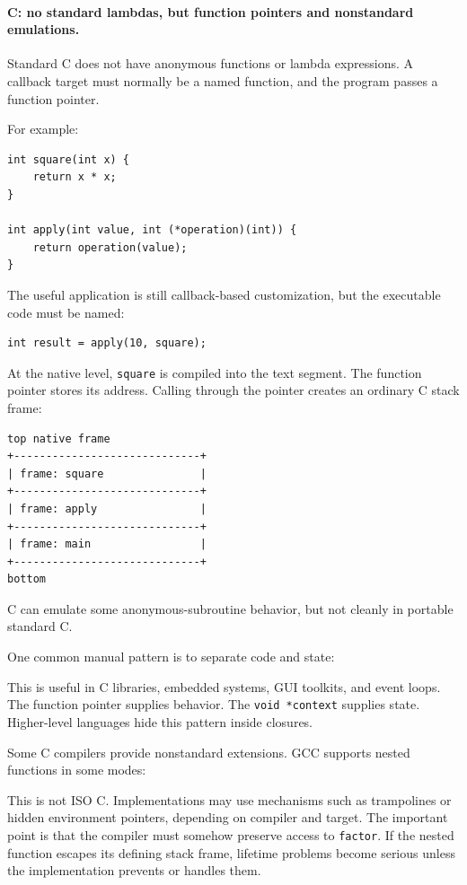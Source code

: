 \paragraph{C: no standard lambdas, but function pointers and nonstandard emulations.}

Standard C does not have anonymous functions or lambda expressions. A callback target must normally be a named function, and the program passes a function pointer.

For example:

\begin{verbatim}
int square(int x) {
    return x * x;
}

int apply(int value, int (*operation)(int)) {
    return operation(value);
}
\end{verbatim}

The useful application is still callback-based customization, but the executable code must be named:

\begin{verbatim}
int result = apply(10, square);
\end{verbatim}

At the native level, \texttt{square} is compiled into the text segment. The function pointer stores its address. Calling through the pointer creates an ordinary C stack frame:

\begin{verbatim}
top native frame
+-----------------------------+
| frame: square               |
+-----------------------------+
| frame: apply                |
+-----------------------------+
| frame: main                 |
+-----------------------------+
bottom
\end{verbatim}

C can emulate some anonymous-subroutine behavior, but not cleanly in portable standard C.

One common manual pattern is to separate code and state:

This is useful in C libraries, embedded systems, GUI toolkits, and event loops. The function pointer supplies behavior. The \texttt{void *context} supplies state. Higher-level languages hide this pattern inside closures.

Some C compilers provide nonstandard extensions. GCC supports nested functions in some modes:

This is not ISO C. Implementations may use mechanisms such as trampolines or hidden environment pointers, depending on compiler and target. The important point is that the compiler must somehow preserve access to \texttt{factor}. If the nested function escapes its defining stack frame, lifetime problems become serious unless the implementation prevents or handles them.

